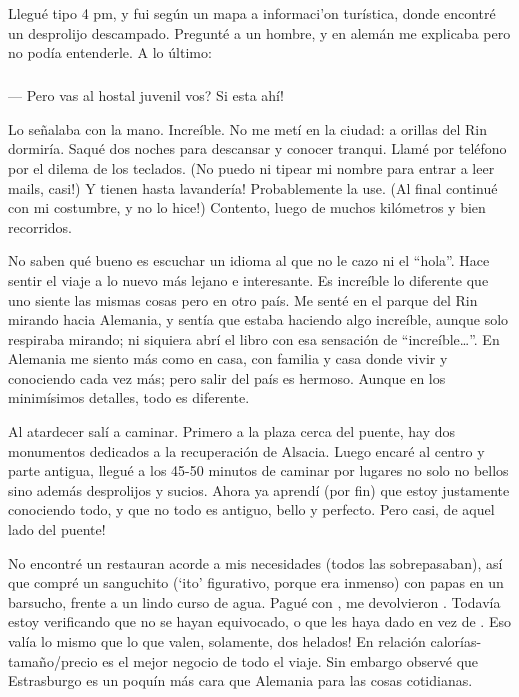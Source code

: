 Llegu\'e tipo 4 pm, y fui seg\'un un mapa a informaci'on tur\'istica, donde
encontr\'e un desprolijo descampado. Pregunt\'e a un hombre, y en alem\'an me
explicaba pero no pod\'ia entenderle. A lo \'ultimo:

\subparagraph{}\label{ssub:estaAhi} --- \textquestiondown Pero vas al hostal
juvenil vos? \textexclamdown Si esta ah\'i!\\ \hangindent=1cm

Lo se\~nalaba con la mano. Incre\'ible. No me met\'i en la ciudad: a orillas
del Rin dormir\'ia. Saqu\'e dos noches para descansar y conocer tranqui. Llam\'e
por tel\'efono por el dilema de los teclados. (\textexclamdown No puedo ni
tipear mi nombre para entrar a leer mails, casi!) \textexclamdown Y tienen hasta
lavander\'ia! Probablemente la use. (Al final continu\'e con mi costumbre,
\textexclamdown y no lo hice!) Contento, luego de muchos kil\'ometros y bien
recorridos.

No saben qu\'e bueno es escuchar un idioma al que no le cazo ni el ``hola''.
Hace sentir el viaje a lo nuevo m\'as lejano e interesante. Es incre\'ible lo
diferente que uno siente las mismas cosas pero en otro pa\'is. Me sent\'e en
el parque del Rin mirando hacia Alemania, y sent\'ia que estaba haciendo algo
incre\'ible, aunque solo respiraba mirando; ni siquiera abr\'i el libro con
esa sensaci\'on de ``incre\'ible\ldots''. En Alemania me siento m\'as como en
casa, con familia y casa donde vivir y conociendo cada vez m\'as; pero salir
del pa\'is es hermoso. Aunque en los minim\'isimos detalles, todo es
diferente.

Al atardecer sal\'i a caminar. Primero a la plaza cerca del puente, hay dos
monumentos dedicados a la recuperaci\'on de Alsacia. Luego encar\'e al centro
y parte antigua, llegu\'e a los 45-50 minutos de caminar por lugares no solo
no bellos sino adem\'as desprolijos y sucios. Ahora ya aprend\'i (por fin) que
estoy justamente conociendo todo, y que no todo es antiguo, bello y perfecto.
\textexclamdown Pero casi, de aquel lado del puente!

No encontr\'e un restauran acorde a mis necesidades (todos las sobrepasaban),
as\'i que compr\'e un sanguchito (`ito' figurativo, porque era inmenso) con
papas en un barsucho, frente a un lindo curso de agua. Pagu\'e con
, me devolvieron . Todav\'ia estoy
verificando que no se hayan equivocado, o que les haya dado 
en vez de . \textexclamdown Eso val\'ia lo mismo que lo que
valen, solamente, dos helados! En relaci\'on calor\'ias-tama\~no/precio es el
mejor negocio de todo el viaje. Sin embargo observ\'e que Estrasburgo es un
poqu\'in m\'as cara que Alemania para las cosas cotidianas.

